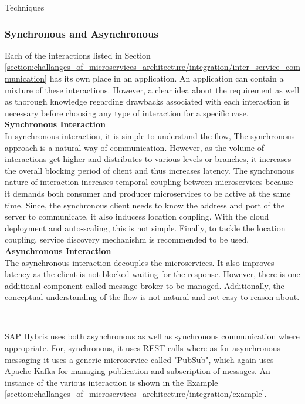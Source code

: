 \begin{shaded}Techniques\end{shaded}
\subsubsection{Synchronous and Asynchronous}\label{section:challanges_of_microservices_architecture/integration/synchronous_and_asynchronous}
Each of the interactions listed in Section \ref{section:challanges_of_microservices_architecture/integration/inter_service_communication} has its own place in an application. An application can contain a mixture of these interactions. However, a clear idea about the requirement as well as thorough knowledge regarding drawbacks associated with each interaction is necessary before choosing any type of interaction for a specific case.\cite{Newman:2015aa}\cite{Richardson:2014aa}\cite{Morris:2015aa}\\
\textbf{Synchronous Interaction}
\\
In synchronous interaction, it is simple to understand the flow, The synchronous approach is a natural way of communication. However, as the volume of interactions get higher and distributes to various levels or branches, it increases the overall blocking period of client and thus increases latency. The synchronous nature of interaction increases temporal coupling between microservices because it demands both consumer and producer microservices to be active at the same time. Since, the synchronous client needs to know the address and port of the server to communicate, it also inducess location coupling. With the cloud deployment and auto-scaling, this is not simple. Finally, to tackle the location coupling, service discovery mechanishm is recommended to be used.
\\
  
\textbf{Asynchronous Interaction}
\\
The asynchronous interaction decouples the microservices. It also improves latency as the client is not blocked waiting for the response. However, there is one additional component called message broker to be managed. Additionally, the conceptual understanding of the flow is not natural and not easy to reason about.

\\
\begin{shaded}
SAP Hybris uses both asynchronous as well as synchronous communication where appropriate. For, synchronous, it uses \acrshort{REST} calls where as for asynchronous messaging it uses a generic microservice called "PubSub", which again uses Apache Kafka for managing publication and subscription of messages. An instance of the various interaction is shown in the Example \ref{section:challanges_of_microservices_architecture/integration/example}. 
\end{shaded}
